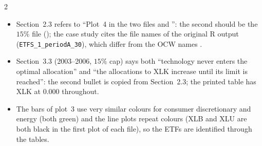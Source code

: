 \begin{paracol}{2}
\begin{coursenote}
\begin{itemize}
  \item Section~2.3 refers to ``Plot~4 in the two files  and '': the second
      should be the $15\%$ file (); the case study cites the file names of the original R output
      (\texttt{ETFS\_1\_periodA\_30}), which differ from the OCW names .
  \item Section~3.3 (2003--2006, $15\%$ cap) says both ``technology
      never enters the optimal allocation'' and ``the allocations to XLK increase until its limit is reached'': the second
      bullet is copied from Section~2.3; the printed table has XLK at $0.000$ throughout.
  \item The bars of plot~3 use very
      similar colours for consumer discretionary and energy (both green) and the line plots repeat colours (XLB and XLU are both
      black in the first plot of each file), so the ETFs are identified through the tables.
\end{itemize}
\end{coursenote}


\end{paracol}
